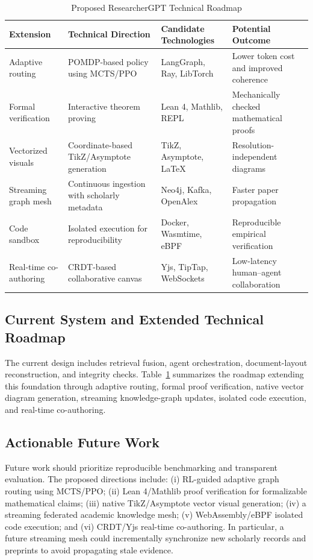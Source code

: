 \documentclass[conference]{IEEEtran}
\begin{document}
\begin{table}[!t]
\centering
\caption{Proposed ResearcherGPT Technical Roadmap}
\label{tab:roadmap}
\small
\begin{tabularx}{\textwidth}{@{}l X X X@{}}
\toprule
\textbf{Extension} & \textbf{Technical Direction} & \textbf{Candidate Technologies} & \textbf{Potential Outcome} \\
\midrule
Adaptive routing & POMDP-based policy using MCTS/PPO & LangGraph, Ray, LibTorch & Lower token cost and improved coherence \\
Formal verification & Interactive theorem proving & Lean 4, Mathlib, REPL & Mechanically checked mathematical proofs \\
Vectorized visuals & Coordinate-based TikZ/Asymptote generation & TikZ, Asymptote, \LaTeX & Resolution-independent diagrams \\
Streaming graph mesh & Continuous ingestion with scholarly metadata & Neo4j, Kafka, OpenAlex & Faster paper propagation \\
Code sandbox & Isolated execution for reproducibility & Docker, Wasmtime, eBPF & Reproducible empirical verification \\
Real-time co-authoring & CRDT-based collaborative canvas & Yjs, TipTap, WebSockets & Low-latency human--agent collaboration \\
\bottomrule
\end{tabularx}
\end{table}

\subsection{Current System and Extended Technical Roadmap}
The current design includes retrieval fusion, agent orchestration, document-layout reconstruction, and integrity checks. Table~\ref{tab:roadmap} summarizes the roadmap extending this foundation through adaptive routing, formal proof verification, native vector diagram generation, streaming knowledge-graph updates, isolated code execution, and real-time co-authoring.

\subsection{Actionable Future Work}
Future work should prioritize reproducible benchmarking and transparent evaluation. The proposed directions include: (i) RL-guided adaptive graph routing using MCTS/PPO; (ii) Lean 4/Mathlib proof verification for formalizable mathematical claims; (iii) native TikZ/Asymptote vector visual generation; (iv) a streaming federated academic knowledge mesh; (v) WebAssembly/eBPF isolated code execution; and (vi) CRDT/Yjs real-time co-authoring. In particular, a future streaming mesh could incrementally synchronize new scholarly records and preprints to avoid propagating stale evidence.
\end{document}
